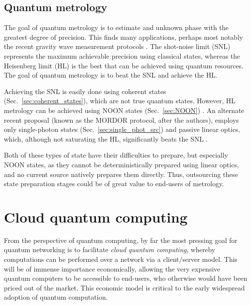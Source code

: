 \documentclass[aps,rmp,twocolumn,amsmath,amssymb,nofootinbib,superscriptaddress,longbibliography,floatfix]{revtex4-1}
\begin{document}
%
%

\subsection{Quantum metrology} \label{sec:metrology}

The goal of quantum metrology is to estimate and unknown phase with the greatest degree of precision. This finds many applications, perhaps most notably the recent gravity wave measurement protocols \cite{???}. The shot-noise limit (SNL) represents the maximum achievable precision using classical states, whereas the Heisenberg limit (HL) is the best that can be achieved using quantum resources. The goal of quantum metrology is to beat the SNL and achieve the HL.

Achieving the SNL is easily done using coherent states (Sec.~\ref{sec:coherent_states}), which are not true quantum states. However, HL metrology can be achieved using NOON states (Sec.~\ref{sec:NOON}) \cite{bib:Dowling08}. An alternate recent proposal (known as the MORDOR protocol, after the authors), employs only single-photon states (Sec.~\ref{sec:single_phot_src}) and passive linear optics, which, although not saturating the HL, significantly beats the SNL \cite{MORDOR, MORDOR2}.

Both of these types of state have their difficulties to prepare, but especially NOON states, as they cannot be deterministically prepared using linear optics, and no current source natively prepares them directly. Thus, outsourcing these state preparation stages could be of great value to end-users of metrology.

\cite{DomBerry}

%
%

\section{Cloud quantum computing} \label{sec:cloud}

From the perspective of quantum computing, by far the most pressing goal for quantum networking is to facilitate \emph{cloud quantum computing}, whereby computations can be performed over a network via a client/server model. This will be of immense importance economically, allowing the very expensive quantum computers to be accessible to end-users, who otherwise would have been priced out of the market. This economic model is critical to the early widespread adoption of quantum computation.
\end{document}
